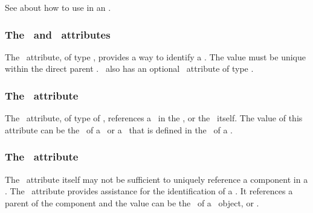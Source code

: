 See  about how to use \SpeciesTypeComponentIndex in an \outwardBindingSite.

\label{def:SpeciesTypeComponentIndexNote}

\subsubsection{The \idAtt\ and \nameAtt\ attributes}
\label{def:SpeciesTypeComponentIndex:id}

The \idAtt\ attribute, of type \SIdPT, provides a way to identify a \speciesTypeComponentIndex. The value must be unique within the direct parent \speciesType. \SpeciesTypeComponentIndex\ also has an optional \nameAtt\ attribute of type \stringPT.

\subsubsection{The \componentAtt\ attribute}
\label{def:SpeciesTypeComponentIndex:component}

The \componentAtt\ attribute, of type of \SIdRefPT, references a \speciesTypeInstance\ in the \speciesType, or the \speciesType\ itself. The value of this attribute can be the \idAtt\ of a \speciesTypeInstance\ or a \speciesTypeComponentIndex\ that is defined in the \speciesType\ of a \speciesTypeInstance. 

\subsubsection{The \identifyingParentAtt\ attribute}
\label{def:SpeciesTypeComponentIndex:identifyingParent}

The \componentAtt\ attribute itself may not be sufficient to uniquely reference a component in a \speciesType. The \identifyingParentAtt\ attribute provides assistance for the identification of a \componentWR. It references a parent of the component and the value can be the \idAtt\ of a \SpeciesTypeInstance\ object, \SpeciesTypeComponentIndex or \SpeciesType.

